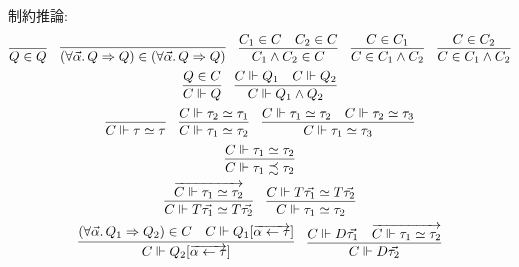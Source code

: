 制約推論:
\begin{gather*}
  \infer{Q \in Q}{}
  \hspace{1em}
  \infer{(\forall \vec{\alpha}\ldotp Q \Rightarrow Q) \in (\forall \vec{\alpha}\ldotp Q \Rightarrow Q)}{}
  \hspace{1em}
  \infer{C_1 \land C_2 \in C}{
    C_1 \in C
    &
    C_2 \in C
  }
  \hspace{1em}
  \infer{C \in C_1 \land C_2}{
    C \in C_1
  }
  \hspace{1em}
  \infer{C \in C_1 \land C_2}{
    C \in C_2
  }
  \\
  \infer{C \Vdash Q}{Q \in C}
  \hspace{1em}
  \infer{C \Vdash Q_1 \land Q_2}{C \Vdash Q_1 & C \Vdash Q_2}
  \\
  \infer{C \Vdash \tau \simeq \tau}{}
  \hspace{1em}
  \infer{C \Vdash \tau_1 \simeq \tau_2}{C \Vdash \tau_2 \simeq \tau_1}
  \hspace{1em}
  \infer{C \Vdash \tau_1 \simeq \tau_3}{C \Vdash \tau_1 \simeq \tau_2 & C \Vdash \tau_2 \simeq \tau_3}
  \\
  \infer{C \Vdash \tau_1 \precsim \tau_2}{
    C \Vdash \tau_1 \simeq \tau_2
  }
  \\
  \infer{C \Vdash T \vec{\tau_1} \simeq T \vec{\tau_2}}{\overrightarrow{C \Vdash \tau_1 \simeq \tau_2}}
  \hspace{1em}
  \infer{C \Vdash \tau_1 \simeq \tau_2}{C \Vdash T \vec{\tau_1} \simeq T \vec{\tau_2}}
  \\
  \infer{C \Vdash Q_2[\overrightarrow{\alpha \assign \tau}]}{
    (\forall \vec{\alpha}\ldotp Q_1 \Rightarrow Q_2) \in C
    &
    C \Vdash Q_1[\overrightarrow{\alpha \assign \tau}]
  }
  \hspace{1em}
  \infer{C \Vdash D \vec{\tau_2}}{
    C \Vdash D \vec{\tau_1}
    &
    \overrightarrow{C \Vdash \tau_1 \simeq \tau_2}
  }
\end{gather*}
